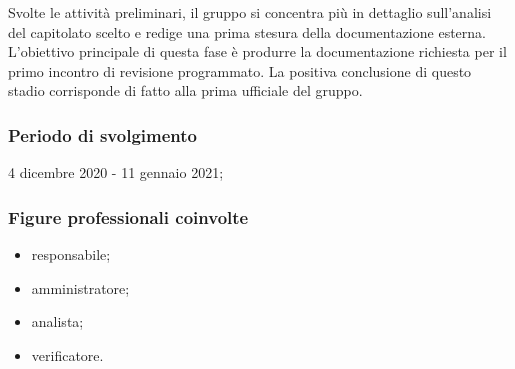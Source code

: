Svolte le attività preliminari, il gruppo si concentra più in dettaglio sull'analisi del capitolato scelto e redige una prima stesura della documentazione esterna. L'obiettivo principale di questa fase è produrre la documentazione richiesta per il primo incontro di revisione programmato. La positiva conclusione di questo stadio corrisponde di fatto alla prima  ufficiale del gruppo.
        
        \subsubsection{Periodo di svolgimento}
        4 dicembre 2020 - 11 gennaio 2021;
        
        \subsubsection{Figure professionali coinvolte}
            \begin{itemize}
                \item responsabile;
                \item amministratore;
                \item analista;
                \item verificatore.
            \end{itemize}
        
